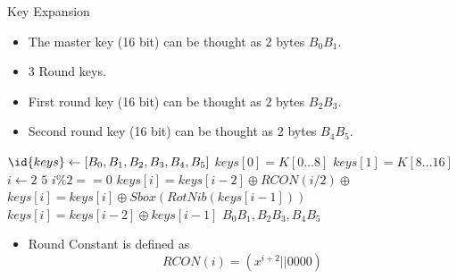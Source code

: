 \begin{frame}{Key Expansion}
    \begin{itemize}
        \item The master key (16 bit) can be thought as 2 bytes $B_0B_1$.
        \pause
        \item 3 Round keys.
        \pause
        \item First round key (16 bit) can be thought as 2 bytes $B_2B_3$.
        \pause
        \item Second round key (16 bit) can be thought as 2 bytes $B_4B_5$.
    \end{itemize}
        \pause
        \begin{codebox}
        \label{proc:ke}
        \li $\id{keys} \gets [B_0,B_1,B_2,B_3,B_4,B_5]$
        \li $keys[0] = K[0 \dots 8]$
        \li $keys[1] = K[8 \dots 16]$
        \li  \For $i \gets 2$ \To $5$
        \li     \Do
                        \If $i\%2 == 0$
        \li                 \Then
                                $keys[i] = keys[i-2] \oplus RCON(i/2) \oplus$
        \li                     $keys[i] = keys[i] \oplus Sbox(RotNib(keys[i-1]))$
        \li                \Else
        \li                    $keys[i] = keys[i-2]\oplus keys[i-1]$
                            \End
                \End
        \li \Return $B_0B_1, B_2B_3, B_4B_5$
        \end{codebox}
        \pause
     \begin{itemize}
         \item Round Constant is defined as \[RCON(i) = (x^{i+2} || 0000)\]
     \end{itemize}

\end{frame}
